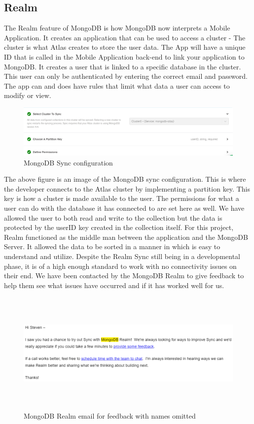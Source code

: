 \subsection{Realm}
The Realm feature of MongoDB is how MongoDB now interprets a Mobile Application. It creates an application that can be used to access a cluster - The cluster is what Atlas creates to store the user data.
\newline
The App will have a unique ID that is called in the Mobile Application back-end to link your application to MongoDB. It creates a user that is linked to a specific database in the cluster. This user can only be authenticated by entering the correct email and password. The app can and does have rules that limit what data a user can access to modify or view.
\begin{figure}[H]
    \centering
    \includegraphics[width=15cm]{img/syncSetup.PNG}
    \caption{MongoDB Sync configuration}
    \label{fig:MongoDB Sync configuration}
\end{figure}
The above figure is an image of the MongoDB sync configuration. This is where the developer connects to the Atlas cluster by implementing a partition key. This key is how a cluster is made available to the user. The permissions for what a user can do with the database it has connected to are set here as well. We have allowed the user to both read and write to the collection but the data is protected by the userID key created in the collection itself.\newline
For this project, Realm functioned as the middle man between the application and the MongoDB Server. It allowed the data to be sorted in a manner in which is easy to understand and utilize. Despite the Realm Sync still being in a developmental phase, it is of a high enough standard to work with no connectivity issues on their end. \newline
We have been contacted by the MongoDB Realm to give feedback to help them see what issues have occurred and if it has worked well for us.
\begin{figure}[H]
    \centering
    \includegraphics[width=15cm, height = 6cm]{img/feedback_email.PNG}
    \caption{MongoDB Realm email for feedback with names omitted}
    \label{fig:MongoDB Realm contact}
\end{figure}
